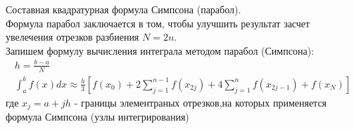 \documentclass[__main__.tex]{subfiles}
\begin{document}
Составная квадратурная формула Симпсона (парабол).\\

Формула парабол заключается в том, чтобы улучшить результат засчет увелечения отрезков разбиения $N = 2n$.\\
Запишем формулу вычисления интеграла методом парабол (Симпсона):
\begin{gather*}
    h = \frac{b-a}{N}\\
    \int_a^b f(x)dx \approx \frac{h}{3}\left[f(x_0)+2\sum_{j=1}^{n-1}f(x_{2j})+4\sum_{j=1}^{n}f(x_{2j-1})+f(x_N)\right]
\end{gather*}
где $x_j = a+jh$ - границы элементраных отрезков,на которых применяется формула Симпсона (узлы интегрирования)
\end{document}
